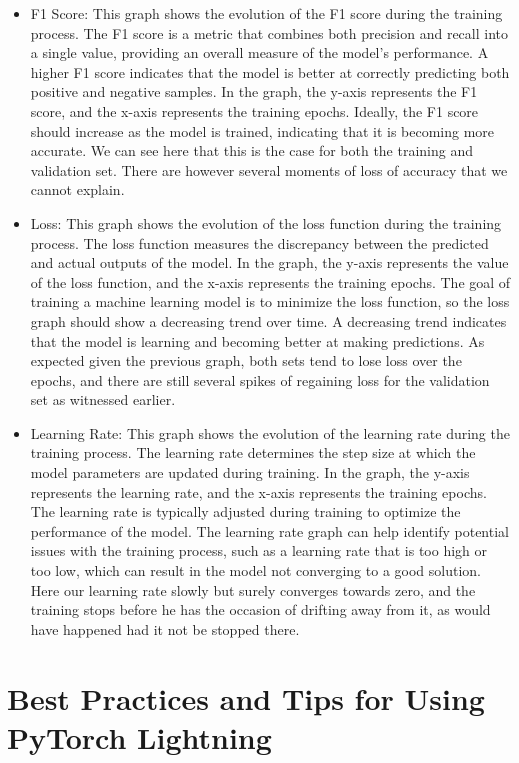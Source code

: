 \documentclass[12pt]{article}
\begin{document}
\begin{itemize}
    \item F1 Score: This graph shows the evolution of the F1 score during the training process. The F1 score is a metric that combines both precision and recall into a single value, providing an overall measure of the model's performance. A higher F1 score indicates that the model is better at correctly predicting both positive and negative samples. In the graph, the y-axis represents the F1 score, and the x-axis represents the training epochs. Ideally, the F1 score should increase as the model is trained, indicating that it is becoming more accurate.
          We can see here that this is the case for both the training and validation set. There are however several moments of loss of accuracy that we cannot explain.
    \item Loss: This graph shows the evolution of the loss function during the training process. The loss function measures the discrepancy between the predicted and actual outputs of the model. In the graph, the y-axis represents the value of the loss function, and the x-axis represents the training epochs. The goal of training a machine learning model is to minimize the loss function, so the loss graph should show a decreasing trend over time. A decreasing trend indicates that the model is learning and becoming better at making predictions.
          As expected given the previous graph, both sets tend to lose loss over the epochs, and there are still several spikes of regaining loss for the validation set as witnessed earlier.
    \item Learning Rate: This graph shows the evolution of the learning rate during the training process. The learning rate determines the step size at which the model parameters are updated during training. In the graph, the y-axis represents the learning rate, and the x-axis represents the training epochs. The learning rate is typically adjusted during training to optimize the performance of the model. The learning rate graph can help identify potential issues with the training process, such as a learning rate that is too high or too low, which can result in the model not converging to a good solution.
          Here our learning rate slowly but surely converges towards zero, and the training stops before he has the occasion of drifting away from it, as would have happened had it not be stopped there.
\end{itemize}

\section{Best Practices and Tips for Using PyTorch Lightning}
\end{document}
